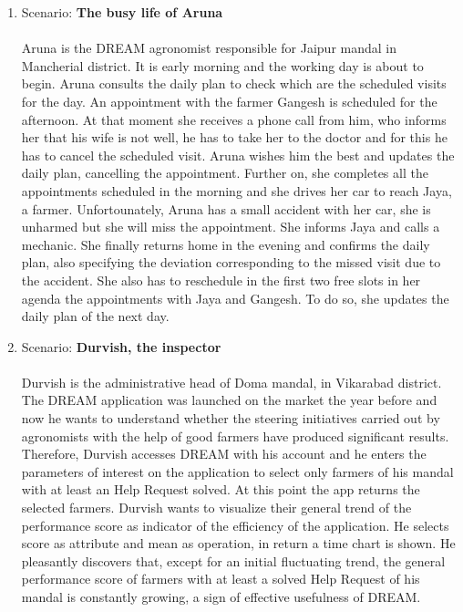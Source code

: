 \begin{enumerate}
\item Scenario: \textbf{The busy life of Aruna}\\\\
Aruna is the DREAM agronomist responsible for Jaipur mandal in Mancherial district. It is early morning and the working day is about to begin. Aruna consults the daily plan to check which are the scheduled visits for the day. An appointment with the farmer Gangesh is scheduled for the afternoon. At that moment she receives a phone call from him, who informs her that his wife is not well, he has to take her to the doctor and for this he has to cancel the scheduled visit. Aruna wishes him the best and updates the daily plan, cancelling the appointment. Further on, she completes all the appointments scheduled in the morning and she drives her car to reach Jaya, a farmer. Unfortounately, Aruna has a small accident with her car, she is unharmed but she will miss the appointment. She informs Jaya and calls a mechanic. She finally returns home in the evening and confirms the daily plan, also specifying the deviation corresponding to the missed visit due to the accident. She also has to reschedule in the first two free slots in her agenda the appointments with Jaya and Gangesh. To do so, she updates the daily plan of the next day. 
\\
\item Scenario: \textbf{Durvish, the inspector}\\\\
Durvish is the administrative head of Doma mandal, in Vikarabad district. The DREAM application was launched on the market the year before and now he wants to understand whether the steering initiatives carried out by agronomists with the help of good farmers have produced significant results. Therefore, Durvish accesses DREAM with his account and he enters the parameters of interest on the application to select only farmers of his mandal with at least an Help Request solved.
At this point the app returns the selected farmers. Durvish wants to visualize their general trend of the performance score as indicator of the efficiency of the application. He selects score as attribute and mean as operation, in return a time chart is shown. He pleasantly discovers that, except for an initial fluctuating trend, the general performance score of farmers with at least a solved Help Request of his mandal is constantly growing, a sign of effective usefulness of DREAM.
\\


\end{enumerate}
